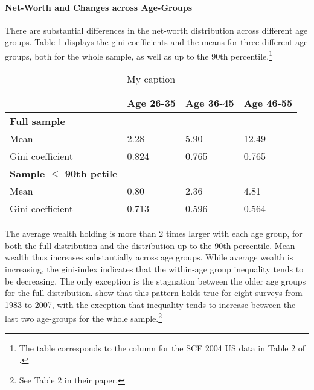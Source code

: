\documentclass[a4paper,12pt,legno]{article}
\begin{document}
\paragraph{Net-Worth and Changes across Age-Groups}
There are substantial differences in the net-worth distribution across different age groups. Table \ref{facts_changes} displays the gini-coefficients and the means for three different age groups, both for the whole sample, as well as up to the 90th percentile.\footnote{The table corresponds to the column for the SCF 2004 US data in Table 2 of \cite{hintermaier2011}. } \\

\begin{table}[!htbp]
\centering
\caption{My caption}
\label{facts_changes}
\begin{tabular}{@{}llll@{}}
\toprule
                     & Age 26-35 & Age 36-45 & Age 46-55 \\ \midrule
\textbf{Full sample}          &           &           &           \\
Mean                 & 2.28      & 5.90      & 12.49     \\
Gini coefficient     & 0.824     & 0.765     & 0.765     \\
\textbf{Sample $\leq$ 90th pctile} &           &           &           \\
Mean                 & 0.80      & 2.36      & 4.81      \\
Gini coefficient     & 0.713     & 0.596     & 0.564     \\ \bottomrule
\end{tabular}
\end{table}

The average wealth holding is more than $2$ times larger with each age group, for both the full distribution and the distribution up to the 90th percentile. Mean wealth thus increases substantially across age groups. While average wealth is increasing, the gini-index indicates that the within-age group inequality tends to be decreasing. The only exception is the stagnation between the older age groups for the full distribution. \cite{hintermaier2011} show that this pattern holds true for eight surveys from 1983 to 2007, with the exception that inequality tends to  increase between the last two age-groups for the whole sample.\footnote{See Table 2 in their paper.} \\
\end{document}

